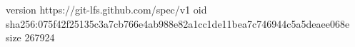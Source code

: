 version https://git-lfs.github.com/spec/v1
oid sha256:075f42f25135c3a7cb766e4ab988e82a1cc1de11bea7c746944c5a5deaee068e
size 267924
